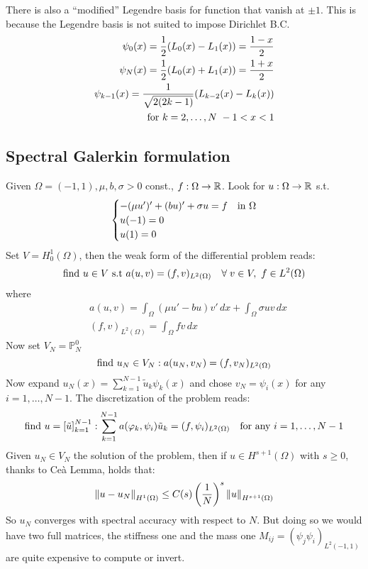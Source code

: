 There is also a ``modified'' Legendre basis for function that vanish at \(\pm 1\). This is because the Legendre basis is not suited to impose Dirichlet B.C.
\begin{align}
    \psi_0(x) = \frac{1}{2} (L_0(x) - L_1(x)) = \frac{1-x}{2} \\ 
    \psi_N(x) = \frac{1}{2} (L_0(x) + L_1(x)) = \frac{1+x}{2} \\ 
    \psi_{k-1}(x) = \frac{1}{\sqrt{2(2k-1)}} (L_{k-2}(x) - L_k(x))\\ 
    \text{for } k = 2, \ldots, N \ -1 < x < 1 \\ 
\end{align}

\subsection{Spectral Galerkin formulation}
Given \(\Omega = (-1, 1), \mu, b, \sigma > 0\) const., \(f: \Omega \to \mathbb{R}\). Look for \(u:\Omega \to \mathbb{R}\) s.t. 
\[
    \begin{cases}
        -(\mu u')'+(bu)' + \sigma u = f & \text{in } \Omega \\
        u(-1) = 0 \\
        u(1) = 0
    \end{cases}
\]
Set \(V  = H^1_0(\Omega)\), then the weak form of the differential problem reads: 
\[
    \text{find } u \in V \text{ s.t } a(u,v) = (f,v)_{L^2(\Omega)} \quad \forall \; v \in V, \ f \in L^2(\Omega)
\]
where 
\begin{align*}
    & a(u,v) = \int_{\Omega} (\mu u' - bu)v'\, dx + \int_{\Omega} \sigma uv \, dx \\
    & (f,v)_{L^2(\Omega)} = \int_{\Omega} f v \, dx
\end{align*}
Now set \(V_N = \mathbb{P}^0_N\) 
\begin{equation}
    \text{find } u_N \in V_N: a(u_N, v_N) = (f, v_N)_{L^2(\Omega)} \label{weak_spec_galerkin_formulation}
\end{equation}
Now expand \(u_N(x) = \sum_{k=1}^{N-1} \tilde{u}_k \psi_k(x)\) and chose \(v_N = \psi_i(x)\) for any \(i = 1, \ldots, N-1\).
The discretization of the problem reads:
\[
    \text{find } u = \left[\tilde{u}\right]_{k=1}^{N-1} : \sum_{k=1}^{N-1} a(\varphi_k, \psi_i)\tilde{u}_k = (f, \psi_i)_{L^2(\Omega)} \quad \text{for any } i = 1, \ldots, N-1
\]
Given \(u_N \in V_N\) the solution of the problem, then if \(u \in H^{s+1}(\Omega)\) with \(s \geq 0\), thanks to Ceà Lemma, holds that:
\[
    \norm{u-u_N}_{H^1(\Omega)} \leq C(s)\left(\frac{1}{N}\right)^s\norm{u}_{H^{s+1}(\Omega)}
\]
So \(u_N\) converges with spectral accuracy with respect to \(N\).
But doing so we would have two full matrices, the stiffness one and the mass one  \(M_{ij} = (\psi_j \psi_i)_{L^2(-1,1)}\) are quite expensive to compute or invert.

